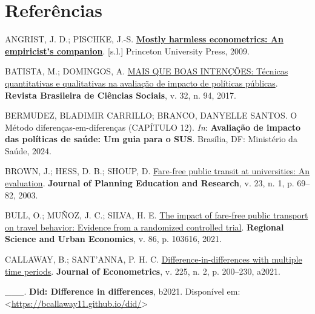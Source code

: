 \documentclass[12pt, a4paper, twoside]{article}
\numberwithin{equation}{subsection} %
\newlength{\cslhangindent}
\newlength{\cslentryspacingunit} %
\newenvironment{CSLReferences}[2] %
 {%
  \setlength{\parindent}{0pt}
  \ifodd #1
  \let\oldpar\par
  \def\par{\hangindent=\cslhangindent\oldpar}
  \fi
  \setlength{\parskip}{#2\cslentryspacingunit}
 }%
 {}
\begin{document}
\newpage

\hypertarget{referuxeancias}{%
\section*{Referências}\label{referuxeancias}}

\hypertarget{refs}{}
\begin{CSLReferences}{0}{0}
\leavevmode{}%
ANGRIST, J. D.; PISCHKE, J.-S.
\textbf{\href{http://www.jstor.org/stable/j.ctvcm4j72}{Mostly harmless
econometrics: An empiricist's companion}}. {[}s.l.{]} Princeton
University Press, 2009.

\leavevmode{}%
BATISTA, M.; DOMINGOS, A.
\href{https://doi.org/10.17666/329414/2017}{MAIS QUE BOAS INTENÇÕES:
Técnicas quantitativas e qualitativas na avaliação de impacto de
políticas públicas}. \textbf{Revista Brasileira de Ciências Sociais}, v.
32, n. 94, 2017.

\leavevmode{}%
BERMUDEZ, BLADIMIR CARRILLO; BRANCO, DANYELLE SANTOS. O {Método}
diferenças-em-diferenças ({CAPÍTULO} 12). \emph{In}: \textbf{Avaliação
de impacto das políticas de saúde: Um guia para o {SUS}}. Brasília, DF:
Ministério da Saúde, 2024.

\leavevmode{}%
BROWN, J.; HESS, D. B.; SHOUP, D.
\href{https://doi.org/10.1177/0739456X03255430}{Fare-free public transit
at universities: An evaluation}. \textbf{Journal of Planning Education
and Research}, v. 23, n. 1, p. 69--82, 2003.

\leavevmode{}%
BULL, O.; MUÑOZ, J. C.; SILVA, H. E.
\href{https://doi.org/10.1016/j.regsciurbeco.2020.103616}{The impact of
fare-free public transport on travel behavior: Evidence from a
randomized controlled trial}. \textbf{Regional Science and Urban
Economics}, v. 86, p. 103616, 2021.

\leavevmode{}%
CALLAWAY, B.; SANT'ANNA, P. H. C.
\href{https://doi.org/10.1016/j.jeconom.2020.12.001}{Difference-in-differences
with multiple time periods}. \textbf{Journal of Econometrics}, v. 225,
n. 2, p. 200--230, a2021.

\leavevmode{}%
\_\_\_. \textbf{Did: Difference in differences}, b2021. Disponível em:
\textless{}\url{https://bcallaway11.github.io/did/}\textgreater{}


\end{CSLReferences}
\end{document}
